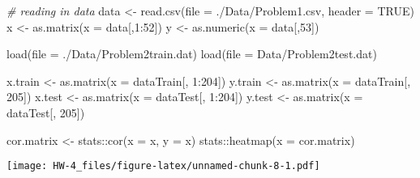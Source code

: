 \documentclass[
]{article}
\newenvironment{Shaded}{\begin{snugshade}}{\end{snugshade}}
\newcommand{\AttributeTok}[1]{\textcolor[rgb]{0.77,0.63,0.00}{#1}}
\newcommand{\CommentTok}[1]{\textcolor[rgb]{0.56,0.35,0.01}{\textit{#1}}}
\newcommand{\ConstantTok}[1]{\textcolor[rgb]{0.00,0.00,0.00}{#1}}
\newcommand{\DecValTok}[1]{\textcolor[rgb]{0.00,0.00,0.81}{#1}}
\newcommand{\FunctionTok}[1]{\textcolor[rgb]{0.00,0.00,0.00}{#1}}
\newcommand{\NormalTok}[1]{#1}
\newcommand{\OtherTok}[1]{\textcolor[rgb]{0.56,0.35,0.01}{#1}}
\newcommand{\SpecialCharTok}[1]{\textcolor[rgb]{0.00,0.00,0.00}{#1}}
\newcommand{\StringTok}[1]{\textcolor[rgb]{0.31,0.60,0.02}{#1}}
\begin{document}
\begin{Shaded}
\begin{Highlighting}[]
\CommentTok{\# reading in data}
\NormalTok{data }\OtherTok{\textless{}{-}} \FunctionTok{read.csv}\NormalTok{(}\AttributeTok{file =} \StringTok{\textquotesingle{}./Data/Problem1.csv\textquotesingle{}}\NormalTok{, }\AttributeTok{header =} \ConstantTok{TRUE}\NormalTok{)}
\NormalTok{x }\OtherTok{\textless{}{-}} \FunctionTok{as.matrix}\NormalTok{(}\AttributeTok{x =}\NormalTok{ data[,}\DecValTok{1}\SpecialCharTok{:}\DecValTok{52}\NormalTok{])}
\NormalTok{y }\OtherTok{\textless{}{-}} \FunctionTok{as.numeric}\NormalTok{(}\AttributeTok{x =}\NormalTok{ data[,}\DecValTok{53}\NormalTok{])}

\FunctionTok{load}\NormalTok{(}\AttributeTok{file =} \StringTok{\textquotesingle{}./Data/Problem2train.dat\textquotesingle{}}\NormalTok{)}
\FunctionTok{load}\NormalTok{(}\AttributeTok{file =} \StringTok{\textquotesingle{}Data/Problem2test.dat\textquotesingle{}}\NormalTok{)}

\NormalTok{x.train }\OtherTok{\textless{}{-}} \FunctionTok{as.matrix}\NormalTok{(}\AttributeTok{x =}\NormalTok{ dataTrain[, }\DecValTok{1}\SpecialCharTok{:}\DecValTok{204}\NormalTok{])}
\NormalTok{y.train }\OtherTok{\textless{}{-}} \FunctionTok{as.matrix}\NormalTok{(}\AttributeTok{x =}\NormalTok{ dataTrain[, }\DecValTok{205}\NormalTok{])}
\NormalTok{x.test }\OtherTok{\textless{}{-}} \FunctionTok{as.matrix}\NormalTok{(}\AttributeTok{x =}\NormalTok{ dataTest[, }\DecValTok{1}\SpecialCharTok{:}\DecValTok{204}\NormalTok{])}
\NormalTok{y.test }\OtherTok{\textless{}{-}} \FunctionTok{as.matrix}\NormalTok{(}\AttributeTok{x =}\NormalTok{ dataTest[, }\DecValTok{205}\NormalTok{])}
\end{Highlighting}
\end{Shaded}

\begin{Shaded}
\begin{Highlighting}[]
\NormalTok{cor.matrix }\OtherTok{\textless{}{-}}\NormalTok{ stats}\SpecialCharTok{::}\FunctionTok{cor}\NormalTok{(}\AttributeTok{x =}\NormalTok{ x, }\AttributeTok{y =}\NormalTok{ x)}
\NormalTok{stats}\SpecialCharTok{::}\FunctionTok{heatmap}\NormalTok{(}\AttributeTok{x =}\NormalTok{ cor.matrix)}
\end{Highlighting}
\end{Shaded}

\texttt{[image: HW-4\_files/figure-latex/unnamed-chunk-8-1.pdf]}
\end{document}
